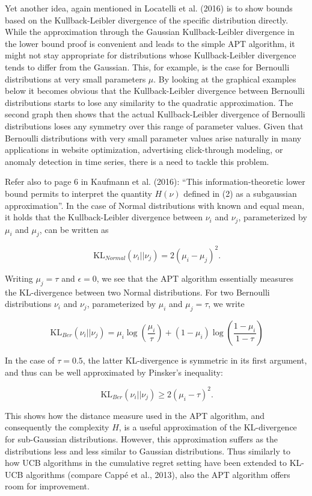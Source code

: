 \documentclass[12pt,]{article}
\newcommand{\KL}{\,\text{KL}}
\begin{document}
Yet another idea, again mentioned in Locatelli et al. (2016) is to show
bounds based on the Kullback-Leibler divergence of the specific
distribution directly. While the approximation through the Gaussian
Kullback-Leibler divergence in the lower bound proof is convenient and
leads to the simple APT algorithm, it might not stay appropriate for
distributions whose Kullback-Leibler divergence tends to differ from the
Gaussian. This, for example, is the case for Bernoulli distributions at
very small parameters \(\mu\). By looking at the graphical examples
below it becomes obvious that the Kullback-Leibler divergence between
Bernoulli distributions starts to lose any similarity to the quadratic
approximation. The second graph then shows that the actual
Kullback-Leibler divergence of Bernoulli distributions loses any
symmetry over this range of parameter values. Given that Bernoulli
distributions with very small parameter values arise naturally in many
applications in website optimization, advertising click-through
modeling, or anomaly detection in time series, there is a need to tackle
this problem.

Refer also to page 6 in Kaufmann et al. (2016): ``This
information-theoretic lower bound permits to interpret the quantity
\(H(\nu)\) defined in (2) as a subgaussian approximation''. In the case
of Normal distributions with known and equal mean, it holds that the
Kullback-Leibler divergence between \(\nu_i\) and \(\nu_j\),
parameterized by \(\mu_i\) and \(\mu_j\), can be written as

\[
\KL_{Normal}(\nu_i || \nu_j) = 2(\mu_i - \mu_j)^2.
\]

Writing \(\mu_j = \tau\) and \(\epsilon = 0\), we see that the APT
algorithm essentially measures the KL-divergence between two Normal
distributions. For two Bernoulli distributions \(\nu_i\) and \(\nu_j\),
parameterized by \(\mu_i\) and \(\mu_j=\tau\), we write

\[
\KL_{Ber}(\nu_i||\nu_j) = \mu_i \log(\frac{\mu_i}{\tau}) + (1-\mu_i) \log(\frac{1-\mu_i}{1-\tau})
\]

In the case of \(\tau = 0.5\), the latter KL-divergence is symmetric in
its first argument, and thus can be well approximated by Pinsker's
inequality:

\[
\KL_{Ber}(\nu_i||\nu_j) \geq 2(\mu_i - \tau)^2.
\]

This shows how the distance measure used in the APT algorithm, and
consequently the complexity \(H\), is a useful approximation of the
KL-divergence for sub-Gaussian distributions. However, this
approximation suffers as the distributions less and less similar to
Gaussian distributions. Thus similarly to how UCB algorithms in the
cumulative regret setting have been extended to KL-UCB algorithms
(compare Cappé et al., 2013), also the APT algorithm offers room for
improvement.
\end{document}
